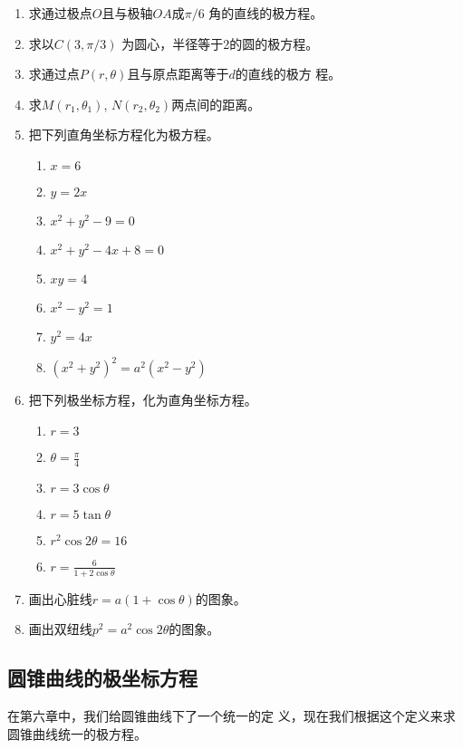 \begin{ex}
\begin{enumerate}
    \item 求通过极点$O$且与极轴$OA$成$\pi/6$
    角的直线的极方程。
    \item 求以$C(3,\pi/3)$
    为圆心，半径等于2的圆的极方程。
    \item 求通过点$P(r,\theta )$且与原点距离等于$d$的直线的极方
    程。
    \item 求$M(r_1,\theta_1)$, $N(r_2,\theta_2)$两点间的距离。
    \item 把下列直角坐标方程化为极方程。
\begin{multicols}{2}
\begin{enumerate}
\item $x=6$
\item $y=2x$
\item $x^2+y^2-9=0$
\item $x^2+y^2-4x+8=0$
\item $xy=4$
\item $x^2-y^2=1$
\item $y^2=4x$
\item $(x^2+y^2)^2=a^2(x^2-y^2)$
\end{enumerate}
\end{multicols}

    \item 把下列极坐标方程，化为直角坐标方程。
\begin{multicols}{2}
\begin{enumerate}
\item $r=3$
\item $\theta=\frac{\pi}{4}$
\item $r=3\cos\theta$
\item $r=5\tan\theta$
\item $r^2\cos 2\theta=16$
\item $r=\frac{6}{1+2\cos\theta}$
\end{enumerate}
\end{multicols}
    \item 画出心脏线$r=a(1+\cos\theta )$的图象。
    \item 画出双纽线$p^2=a^2\cos2\theta$的图象。
\end{enumerate}
\end{ex}

\subsection{圆锥曲线的极坐标方程}
在第六章中，我们给圆锥曲线下了一个统一的定
义，现在我们根据这个定义来求圆锥曲线统一的极方程。

